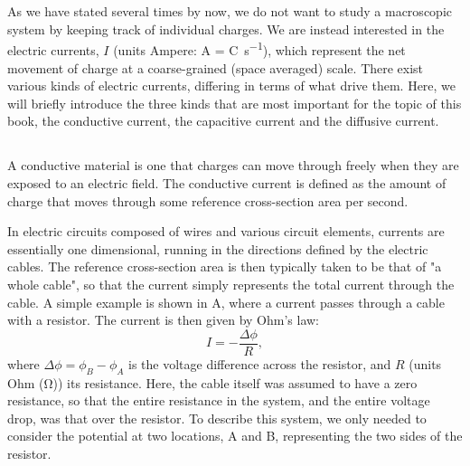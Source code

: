 \section{}
\label{sec:Basics:Current} 
As we have stated several times by now, we do not want to study a macroscopic system by keeping track of individual charges. We are instead interested in the electric currents, $I$ (units Ampere: \si{\ampere} = \si{\coulomb\per\second}), which represent the net movement of charge at a coarse-grained (space averaged) scale. 
 There exist various kinds of electric currents, differing in terms of what drive them. Here, we will briefly introduce the three kinds that are most important for the topic of this book, the conductive current, the capacitive current and the diffusive current.

\subsection{}
\label{sec:Basics:ConductiveCurrent} 
A conductive material   is one that  charges can move through freely when they are exposed to an electric field. The conductive current is defined as the amount of charge that moves through some reference cross-section area per second. 

In electric circuits composed of  wires and various circuit elements, currents are essentially one dimensional, running in the directions defined by the electric cables. The reference cross-section area is then typically taken to be that of "a whole cable", so that the current simply represents the total current through the cable. A simple example is shown in A, where a current passes through a cable with a resistor. The current is then given by Ohm's law:
\begin{equation}
I = - \frac{\Delta \phi}{R}, 
\label{eq:Basics:Ohm_R}
\end{equation}
where $\Delta \phi = \phi_B-\phi_A$ is the voltage difference across the resistor, and $R$ (units Ohm (\si{\ohm})) its resistance. Here, the cable itself was assumed to have a zero resistance, so that the entire resistance in the system, and the entire voltage drop, was that over the resistor. To describe this system, we only needed to consider the potential at two locations, A and B, representing the two sides of the resistor. 

